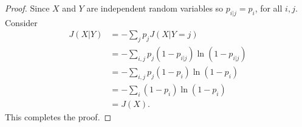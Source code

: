 \documentclass[pdflatex]{sn-jnl}%
\theoremstyle{thmstyleone}
\newtheorem{proposition}{Proposition}
\theoremstyle{thmstyletwo}%
\theoremstyle{thmstylethree}%
\begin{document}
\begin{proof}
    Since $X$ and $Y$ are independent random variables so $p_{i|j}=p_i$, for all $i,j$. Consider 
    \begin{equation}
    \begin{split}
        J(X|Y)&=-\sum_{j}p_{j}J(X|Y=j) \\
             &=-\sum_{i,j}p_{j}\left(1-p_{i|j}\right)\ln\left(1-p_{i|j}\right) \\
             &= -\sum_{i,j}p_j\left(1-p_i \right)\ln\left(1-p_i \right) \\
             &= -\sum_{i}\left(1-p_i \right)\ln\left(1-p_i \right) \\
             &=J(X).
    \end{split}
    \end{equation}
    This completes the proof.
\end{proof}

\end{document}
